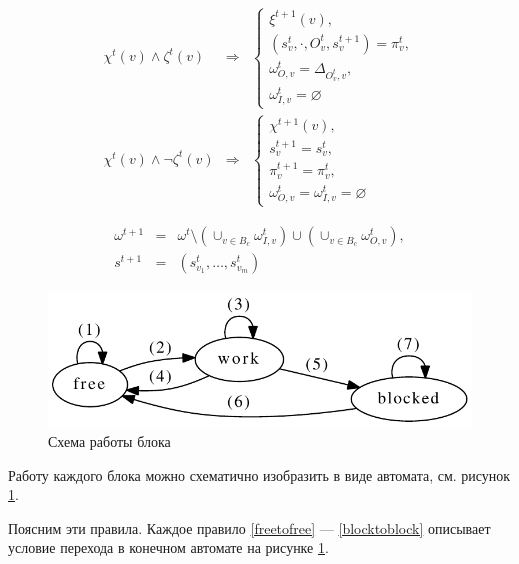 \documentclass[10pt,a4paper]{article}
\begin{document}
\begin{eqnarray}
  \chi^t(v) \wedge \zeta^t(v) & \Rightarrow &
    \begin{cases}
      \xi^{t + 1}(v), \\
      (s^t_v, \cdot, O^t_v, s^{t + 1}_v) = \pi^t_v, \\
      \omega^t_{O, v} = \Delta_{O^t_v, v}, \\
      \omega^t_{I, v} = \varnothing
    \end{cases} \label{blocktofree} \\
  \chi^t(v) \wedge \neg \zeta^t(v) & \Rightarrow &
    \begin{cases}
      \chi^{t + 1}(v), \\
      s^{t + 1}_v = s^t_v, \\
      \pi^{t + 1}_v = \pi^{t}_v, \\
      \omega^t_{O, v} = \omega^t_{I, v} = \varnothing
    \end{cases} \label{blocktoblock}
\end{eqnarray}

\begin{eqnarray}
  \omega^{t + 1} & = & \omega^t \setminus (\cup_{v \in B_c} \omega^t_{I, v}) \cup (\cup_{v \in B_c} \omega^t_{O, v}) \label{newomega}, \\
  s^{t + 1} & = & (s^t_{v_1}, \dots, s^t_{v_m}) \label{newstate}
\end{eqnarray}

\begin{figure}
    \centering
    \includegraphics[width=\textwidth]{rules.pdf}
    \caption{Схема работы блока}
    \label{rules}
\end{figure}

Работу каждого блока можно схематично изобразить в виде автомата, см. рисунок \ref{rules}.

Поясним эти правила. Каждое правило \eqref{freetofree} --- \eqref{blocktoblock} описывает условие перехода в конечном автомате на рисунке \ref{rules}.
\end{document}
